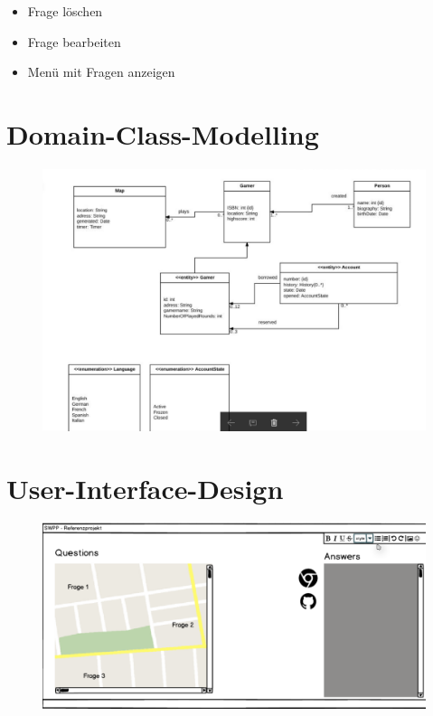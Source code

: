 \begin{itemize}
	\item Frage löschen
	\item Frage bearbeiten
	\item Menü mit Fragen anzeigen
\end{itemize}




\section{Domain-Class-Modelling}

\begin{figure}
	\centering
	\includegraphics[width=1.1\linewidth]{screenshot008}
	\caption{}
	\label{fig:screenshot008}
\end{figure}


\section{User-Interface-Design}



\begin{figure}
		\centering
		\includegraphics[width=0.7\linewidth]{screenshot002}
		\caption{}
		\label{fig:screenshot002}
\end{figure}



